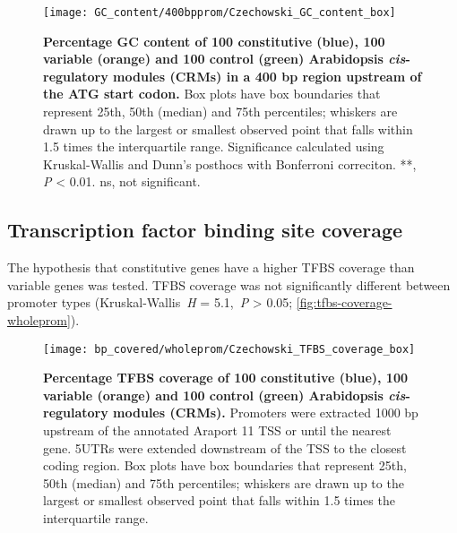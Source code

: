 \documentclass[../main.tex]{subfiles}
\begin{document}
\begin{figure}[hbt!]
	\begin{center}
		\capstart
		\texttt{[image: GC\_content/400bpprom/Czechowski\_GC\_content\_box]}
		\caption{
			\textbf{Percentage GC content of 100 constitutive (blue), 100 variable (orange) and 100 control (green) Arabidopsis \textit{cis}\hyp{}regulatory modules (CRMs) in a 400 bp region upstream of the ATG start codon.}
			Box plots have box boundaries that represent 25th, 50th (median) and 75th percentiles; whiskers are drawn up to the largest or smallest observed point that falls within 1.5 times the interquartile range.
			Significance calculated using Kruskal\hyp{}Wallis and Dunn's posthocs with Bonferroni correciton.
			**, \textit{P} \textless{} 0.01. ns, not significant.
			\label{fig:gc-content-400bpprom}
		}
	\end{center}
\end{figure}




\subsection{Transcription factor binding site coverage}
The hypothesis that constitutive genes have a higher TFBS coverage than variable genes was tested.
TFBS coverage was not significantly different between promoter types (Kruskal\hyp{}Wallis~\textit{H} = 5.1,~\textit{P} \textgreater{} 0.05; \autoref{fig:tfbs-coverage-wholeprom}).

\begin{figure}[hbt!]
	\begin{center}
		\capstart
		\texttt{[image: bp\_covered/wholeprom/Czechowski\_TFBS\_coverage\_box]}
		\caption{
			\textbf{Percentage TFBS coverage of 100 constitutive (blue), 100 variable (orange) and 100 control (green) Arabidopsis \textit{cis}\hyp{}regulatory modules (CRMs).}
			Promoters were extracted 1000 bp upstream of the annotated Araport 11 \autocite{chengAraport11CompleteReannotation2017} TSS or until the nearest gene.
			5UTRs were extended downstream of the TSS to the closest coding region.  Box plots have box boundaries that represent 25th, 50th (median) and 75th percentiles; whiskers are drawn up to the largest or smallest observed point that falls within 1.5 times the interquartile range.		
			\label{fig:tfbs-coverage-wholeprom}
		}
	\end{center}
\end{figure}
\end{document}
